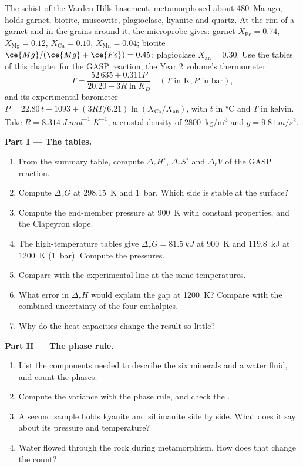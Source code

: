 \begin{problem}
\label{pb:b3:petrological-thermodynamics:1}
The schist of the Varden Hills basement, metamorphosed about
\qty{480}{Ma} ago, holds garnet, biotite, muscovite, plagioclase, kyanite and
quartz. At the rim of a garnet and in the grains around it, the microprobe
gives: garnet $X_{\text{Fe}} = 0.74$, $X_{\text{Mg}} = 0.12$, $X_{\text{Ca}} =
0.10$, $X_{\text{Mn}} = 0.04$; biotite $\ce{Mg}/(\ce{Mg} + \ce{Fe}) = 0.45$;
plagioclase $X_{\text{an}} = 0.30$. Use the tables of this chapter for the
GASP reaction, the Year 2 volume's thermometer
\[
T = \frac{52\,635 + 0.311P}{20.20 - 3R\ln K_D}\quad(T \text{ in K}, P
\text{ in bar}),
\]
and its experimental barometer $P = 22.80\,t - 1093 + (3RT/6.21)\ln
(X_{\text{Ca}}/X_{\text{an}})$, with $t$ in \unit{\celsius} and $T$ in
kelvin. Take $R = \qty{8.314}{J.mol^{-1}.K^{-1}}$, a crustal density of
\qty{2800}{kg/m^3} and $g = \qty{9.81}{m/s^2}$.

\medskip\noindent\textbf{Part I --- The tables.}
\begin{enumerate}
  \item From the summary table, compute $\Delta_rH^\circ$, $\Delta_rS^\circ$
        and $\Delta_rV$ of the GASP reaction.
  \item Compute $\Delta_rG$ at \qty{298.15}{K} and \qty{1}{bar}. Which side
        is stable at the surface?
  \item Compute the end-member pressure at \qty{900}{K} with constant
        properties, and the Clapeyron slope.
  \item The high-temperature tables give $\Delta_rG = \qty{81.5}{kJ}$ at
        \qty{900}{K} and \qty{119.8}{kJ} at \qty{1200}{K} (\qty{1}{bar}).
        Compute the pressures.
  \item Compare with the experimental line at the same temperatures.
  \item What error in $\Delta_rH$ would explain the gap at \qty{1200}{K}?
        Compare with the combined uncertainty of the four enthalpies.
  \item Why do the heat capacities change the result so little?
\end{enumerate}

\medskip\noindent\textbf{Part II --- The phase rule.}
\begin{enumerate}[resume]
  \item List the components needed to describe the six minerals and a water
        fluid, and count the phases.
  \item Compute the variance with the phase rule, and check the .
  \item A second sample holds kyanite and sillimanite side by side. What does
        it say about its pressure and temperature?
  \item Water flowed through the rock during metamorphism. How does that
        change the count?
\end{enumerate}


\end{problem}
